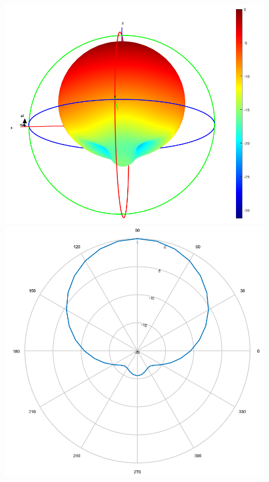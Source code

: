 \begin{figure}[!htb]
  \includegraphics[width=\linewidth]{../images/pattern1/radiationPattern3D.png}
\endminipage\hfill
{}
  \includegraphics[width=\linewidth]{../images/pattern1/ep.png} 
\endminipage\hfill
{}%

\end{figure}
